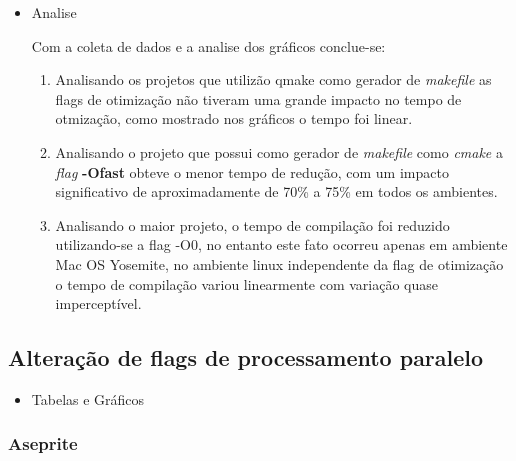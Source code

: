\begin{itemize}
    \item Analise

        Com a coleta de dados e a analise dos gráficos conclue-se:

        \begin{enumerate}
            \item Analisando os projetos que utilizão qmake como gerador de \textit{makefile}
 as flags de otimização não tiveram uma grande impacto no tempo de otmização, como mostrado nos gráficos 
o tempo foi linear. 
            \item Analisando o projeto que possui como gerador de \textit{makefile} como
 \textit{cmake} a \textit{flag} \textbf{-Ofast} obteve o menor tempo de redução, com um impacto
 significativo de aproximadamente de 70\% a 75\% em todos os ambientes.
            \item  Analisando o maior projeto, o tempo de compilação foi reduzido utilizando-se a
 flag -O0, no entanto este fato ocorreu apenas em ambiente Mac OS Yosemite, no ambiente linux independente
 da flag de otimização o tempo de compilação variou linearmente com variação quase imperceptível.
        \end{enumerate}
\end{itemize}



\clearpage
\subsection{Alteração de flags de processamento paralelo}

\begin{itemize}
    \item Tabelas e Gráficos
\end{itemize}


\subsubsection*{Aseprite}

